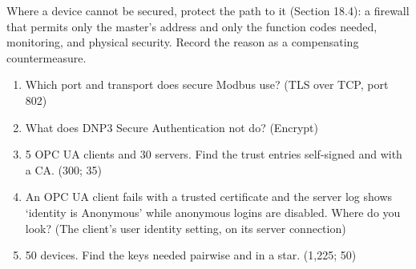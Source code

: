 \onsite Where a device cannot be secured, protect the path to it (Section 18.4): a firewall that permits only the master's address and only the function codes needed, monitoring, and physical security. Record the reason as a compensating countermeasure.

\begin{enumerate}
\item Which port and transport does secure Modbus use? (TLS over TCP, port 802)
\item What does DNP3 Secure Authentication not do? (Encrypt)
\item 5 OPC UA clients and 30 servers. Find the trust entries self-signed and with a CA. (300; 35)
\item An OPC UA client fails with a trusted certificate and the server log shows ‘identity is Anonymous’ while anonymous logins are disabled. Where do you look? (The client's user identity setting, on its server connection)
\item 50 devices. Find the keys needed pairwise and in a star. (1,225; 50)
\end{enumerate}
